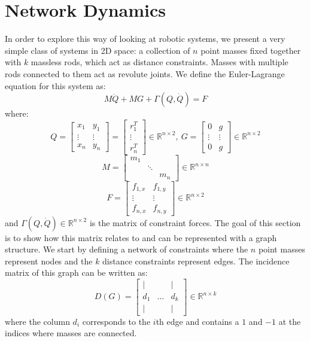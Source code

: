 \documentclass[conference]{article} %
\begin{document}
\section{Network Dynamics}
In order to explore this way of looking at robotic systems, we present a very simple class of systems in 2D space: a collection of $n$ point masses fixed together with $k$ massless rods, which act as distance constraints. Masses with multiple rods connected to them act as revolute joints. We define the Euler-Lagrange equation for this system as:
\begin{equation} \label{eq:EL}
    M\ddot{Q}+MG+\Gamma(Q,\dot{Q})=F
\end{equation}
where:
$$Q=\begin{bmatrix}
    x_1 & y_1\\
    \vdots & \vdots\\
    x_n & y_n
\end{bmatrix}=\begin{bmatrix}
    r_1^T\\ \vdots\\ r_n^T
\end{bmatrix}\in\mathbb{R}^{n\times2},\:
G=\begin{bmatrix}
    0 & g\\
    \vdots & \vdots\\
    0 & g
\end{bmatrix}\in\mathbb{R}^{n\times2}$$
$$M=\begin{bmatrix}
    m_1\\
    & \ddots\\
    & & m_n
\end{bmatrix}\in\mathbb{R}^{n\times n}$$
$$F=\begin{bmatrix}
    f_{1,x} & f_{1,y}\\
    \vdots & \vdots\\
    f_{n,x} & f_{n,y}
\end{bmatrix}\in\mathbb{R}^{n\times2}$$
and $\Gamma(Q,\dot{Q})\in\mathbb{R}^{n\times2}$ is the matrix of constraint forces. The goal of this section is to show how this matrix relates to and can be represented with a graph structure. We start by defining a network of constraints where the $n$ point masses represent nodes and the $k$ distance constraints represent edges. The incidence matrix of this graph can be written as:
$$D(G)= \begin{bmatrix}
    | & & |\\
    d_1 & \hdots & d_k\\
    | & & |
\end{bmatrix}\in\mathbb{R}^{n\times k}$$
where the column $d_i$ corresponds to the $i$th edge and contains a $1$ and $-1$ at the indices where masses are connected.
\end{document}
